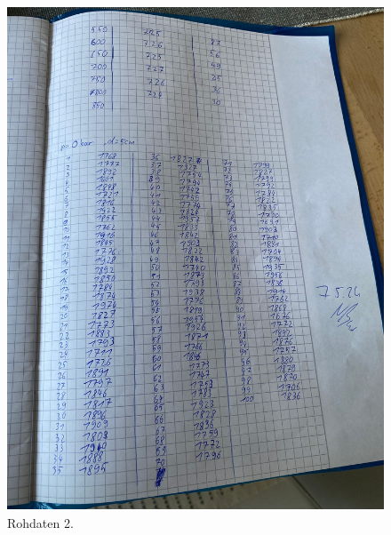 \begin{figure}[H]
  \includegraphics[width=\textwidth, height=15cm]{Bilder/rohdaten2.jpg}
  \caption{Rohdaten 2.}
\end{figure}


